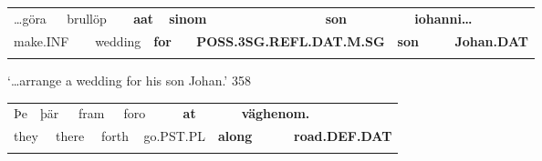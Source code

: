 \begin{listWWNumlxxxivleveli}
\item 

\end{listWWNumlxxxivleveli}

\begin{tabular}{llllllllllll}
\lsptoprule
…göra & \multicolumn{2}{l}{brullöp

} & \multicolumn{2}{l}{{\bfseries aat}

} & \multicolumn{2}{l}{{\bfseries sinom}

} & \multicolumn{2}{l}{{\bfseries son}

} & \multicolumn{2}{l}{{\bfseries iohanni…}

} & \\
\multicolumn{2}{l}{make.INF

} & \multicolumn{2}{l}{wedding

} & \multicolumn{2}{l}{{\bfseries for}

} & \multicolumn{2}{l}{{\bfseries POSS.3SG.REFL.DAT.M.SG}

} & \multicolumn{2}{l}{{\bfseries son}

} & \multicolumn{2}{l}{{\bfseries Johan.DAT}

}\\
\lspbottomrule
\end{tabular}

\begin{styleTranslation}
‘…arrange a wedding for his son Johan.’ 358

\end{styleTranslation}

\begin{tabular}{llllllllllll}
\lsptoprule
Þe & \multicolumn{2}{l}{þär

} & \multicolumn{2}{l}{fram

} & \multicolumn{2}{l}{foro

} & \multicolumn{2}{l}{{\bfseries at}

} & \multicolumn{2}{l}{{\bfseries väghenom.}

} & \\
\multicolumn{2}{l}{they

} & \multicolumn{2}{l}{there

} & \multicolumn{2}{l}{forth

} & \multicolumn{2}{l}{go.PST.PL

} & \multicolumn{2}{l}{{\bfseries along}

} & \multicolumn{2}{l}{{\bfseries road.DEF.DAT}

}\\
\lspbottomrule
\end{tabular}

